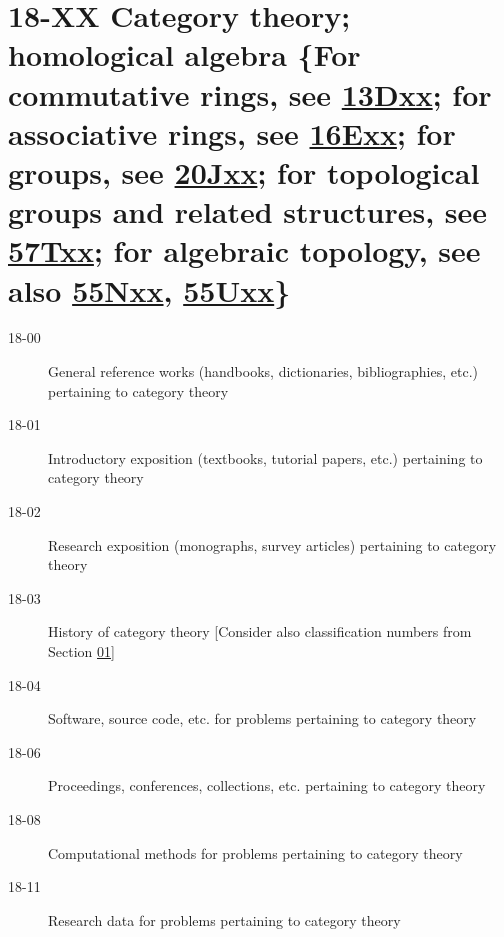 \section*{18-XX Category theory; homological algebra \{For commutative rings, see \hyperref[13Dxx]{13Dxx}; for associative rings, see \hyperref[16Exx]{16Exx}; for groups, see \hyperref[20Jxx]{20Jxx}; for topological groups and related structures, see \hyperref[57Txx]{57Txx}; for algebraic topology, see also \hyperref[55Nxx]{55Nxx}, \hyperref[55Uxx]{55Uxx}\} }\label{18-XX}
\begin{description}
\item [18-00]\label{18-00} General reference works (handbooks, dictionaries, bibliographies, etc.) pertaining to category theory
\item [18-01]\label{18-01} Introductory exposition (textbooks, tutorial papers, etc.) pertaining to category theory
\item [18-02]\label{18-02} Research exposition (monographs, survey articles) pertaining to category theory
\item [18-03]\label{18-03} History of category theory [Consider also classification numbers from Section \hyperref[01-XX]{01}]
\item [18-04]\label{18-04} Software, source code, etc. for problems pertaining to category theory
\item [18-06]\label{18-06} Proceedings, conferences, collections, etc. pertaining to category theory
\item [18-08]\label{18-08} Computational methods for problems pertaining to category theory
\item [18-11]\label{18-11} Research data for problems pertaining to category theory
\end{description}
